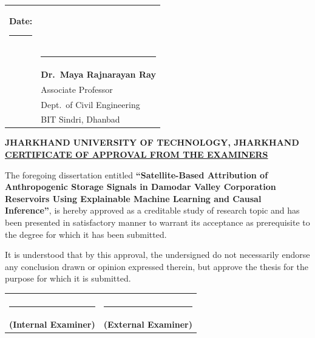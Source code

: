\documentclass[12pt,a4paper,oneside]{report}
\begin{document}
\noindent\begin{tabular}{p{}p{}}
  \textbf{Date:} \rule{3cm}{0.4pt} & \vspace{1.8cm} \\[1.8cm]
  & \rule{6cm}{0.4pt} \\[3pt]
  & \textbf{Dr.\ Maya Rajnarayan Ray} \\
  & Associate Professor \\
  & Dept.\ of Civil Engineering \\
  & BIT Sindri, Dhanbad \\
\end{tabular}


\newpage
\thispagestyle{empty}

\vspace*{0.5cm}

\begin{center}
{\large\bfseries JHARKHAND UNIVERSITY OF TECHNOLOGY, JHARKHAND}\\[12pt]
{\normalsize\bfseries\underline{CERTIFICATE OF APPROVAL FROM THE EXAMINERS}}
\end{center}

\vspace{1cm}

\noindent The foregoing dissertation entitled \textbf{``Satellite-Based
Attribution of Anthropogenic Storage Signals in Damodar Valley Corporation
Reservoirs Using Explainable Machine Learning and Causal Inference''}, is
hereby approved as a creditable study of research topic and has been presented
in satisfactory manner to warrant its acceptance as prerequisite to the degree
for which it has been submitted.

\vspace{0.8cm}

\noindent It is understood that by this approval, the undersigned do not
necessarily endorse any conclusion drawn or opinion expressed therein, but
approve the thesis for the purpose for which it is submitted.

\vspace{3cm}

\noindent\begin{tabular}{p{}p{}}
  & \\
  \rule{5cm}{0.4pt} & \rule{5cm}{0.4pt} \\
  \textbf{(Internal Examiner)} & \textbf{(External Examiner)} \\
\end{tabular}
\end{document}
